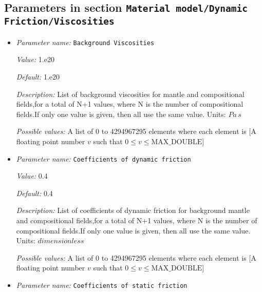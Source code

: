 \subsection{Parameters in section \tt Material model/Dynamic Friction/Viscosities}
\label{parameters:Material_20model/Dynamic_20Friction/Viscosities}

\begin{itemize}
\item {\it Parameter name:} {\tt Background Viscosities}
\label{parameters:Material model/Dynamic Friction/Viscosities/Background Viscosities}
\label{parameters:Material_20model/Dynamic_20Friction/Viscosities/Background_20Viscosities}


{\it Value:} 1.e20


{\it Default:} 1.e20


{\it Description:} List of background viscosities for mantle and compositional fields,for a total of N+1 values, where N is the number of compositional fields.If only one value is given, then all use the same value. Units: $Pa \, s $


{\it Possible values:} A list of 0 to 4294967295 elements where each element is [A floating point number $v$ such that $0 \leq v \leq \text{MAX\_DOUBLE}$]
\item {\it Parameter name:} {\tt Coefficients of dynamic friction}
\label{parameters:Material model/Dynamic Friction/Viscosities/Coefficients of dynamic friction}
\label{parameters:Material_20model/Dynamic_20Friction/Viscosities/Coefficients_20of_20dynamic_20friction}


{\it Value:} 0.4


{\it Default:} 0.4


{\it Description:} List of coefficients of dynamic friction for background mantle and compositional fields,for a total of N+1 values, where N is the number of compositional fields.If only one value is given, then all use the same value. Units: $dimensionless$


{\it Possible values:} A list of 0 to 4294967295 elements where each element is [A floating point number $v$ such that $0 \leq v \leq \text{MAX\_DOUBLE}$]
\item {\it Parameter name:} {\tt Coefficients of static friction}
\label{parameters:Material model/Dynamic Friction/Viscosities/Coefficients of static friction}
\label{parameters:Material_20model/Dynamic_20Friction/Viscosities/Coefficients_20of_20static_20friction}



\end{itemize}
